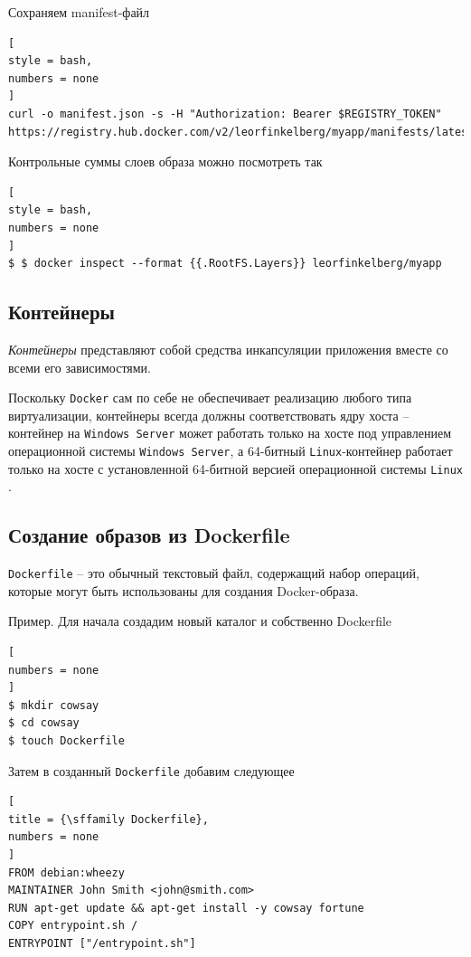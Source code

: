 \documentclass[%
	11pt,
	a4paper,
	utf8,
		]{article}
\begin{document}
Сохраняем manifest-файл
\begin{lstlisting}[
style = bash,
numbers = none
]
curl -o manifest.json -s -H "Authorization: Bearer $REGISTRY_TOKEN" https://registry.hub.docker.com/v2/leorfinkelberg/myapp/manifests/latest
\end{lstlisting}

Контрольные суммы слоев образа можно посмотреть так
\begin{lstlisting}[
style = bash,
numbers = none
]
$ $ docker inspect --format {{.RootFS.Layers}} leorfinkelberg/myapp
\end{lstlisting}


\subsection{Контейнеры}

\emph{Контейнеры} представляют собой средства инкапсуляции приложения вместе со всеми его зависимостями.

Поскольку \texttt{Docker} сам по себе не обеспечивает реализацию любого типа виртуализации, контейнеры всегда должны соответствовать ядру хоста -- контейнер на \texttt{Windows Server} может работать только на хосте под управлением операционной системы \texttt{Windows Server}, а 64-битный \texttt{Linux}-контейнер работает только на хосте с установленной 64-битной версией операционной системы \texttt{Linux} \cite{mouat:docker-2017}.

\subsection{Создание образов из Dockerfile}

\texttt{Dockerfile} -- это обычный текстовый файл, содержащий набор операций, которые могут быть использованы для создания Docker-образа.

Пример. Для начала создадим новый каталог и собственно Dockerfile

\begin{lstlisting}[
numbers = none
]
$ mkdir cowsay
$ cd cowsay
$ touch Dockerfile
\end{lstlisting}

Затем в созданный \texttt{Dockerfile} добавим следующее 
\begin{lstlisting}[
title = {\sffamily Dockerfile},
numbers = none
]
FROM debian:wheezy
MAINTAINER John Smith <john@smith.com>
RUN apt-get update && apt-get install -y cowsay fortune
COPY entrypoint.sh /
ENTRYPOINT ["/entrypoint.sh"]
\end{lstlisting}
\end{document}
